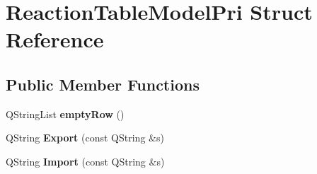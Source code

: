 \hypertarget{struct_reaction_table_model_pri}{}\section{Reaction\+Table\+Model\+Pri Struct Reference}
\label{struct_reaction_table_model_pri}
\subsection*{Public Member Functions}
\begin{DoxyCompactItemize}
\item 
\mbox{\label{struct_reaction_table_model_pri_ad76a63e10b0fd4db66efee82903a5c08}} 
Q\+String\+List {\bfseries empty\+Row} ()
\item 
\mbox{\label{struct_reaction_table_model_pri_a46870f7c9704c9e7a33bcf419c983b6a}} 
Q\+String {\bfseries Export} (const Q\+String \&s)
\item 
\mbox{\label{struct_reaction_table_model_pri_adf1c3c5c1bc103ab9756378be61d98a2}} 
Q\+String {\bfseries Import} (const Q\+String \&s)
\end{DoxyCompactItemize}
